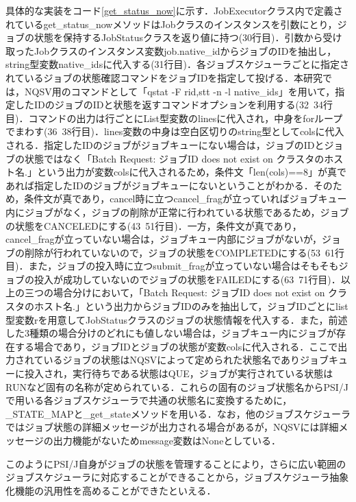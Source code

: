 具体的な実装をコード\ref{get_status_now}に示す．JobExecutorクラス内で定義されているget\_status\_nowメソッドはJobクラスのインスタンスを引数にとり，ジョブの状態を保持するJobStatusクラスを返り値に持つ(30行目)．引数から受け取ったJobクラスのインスタンス変数job.native\_idからジョブのIDを抽出し，string型変数native\_idsに代入する(31行目)．各ジョブスケジューラごとに指定されているジョブの状態確認コマンドをジョブIDを指定して投げる．本研究では，NQSV用のコマンドとして「qstat -F rid,stt -n -l native\_ids」を用いて，指定したIDのジョブのIDと状態を返すコマンドオプションを利用する(32~34行目)．コマンドの出力は行ごとにList型変数のlinesに代入され，中身をforループでまわす(36~38行目)．lines変数の中身は空白区切りのstring型としてcolsに代入される．指定したIDのジョブがジョブキューにない場合は，ジョブのIDとジョブの状態ではなく「Batch Request: ジョブID does not exist on クラスタのホスト名.」という出力が変数colsに代入されるため，条件文「len(cols)==8」が真であれば指定したIDのジョブがジョブキューにないということがわかる．そのため，条件文が真であり，cancel時に立つcancel\_fragが立っていればジョブキュー内にジョブがなく，ジョブの削除が正常に行われている状態であるため，ジョブの状態をCANCELEDにする(43~51行目)．一方，条件文が真であり，cancel\_fragが立っていない場合は，ジョブキュー内部にジョブがないが，ジョブの削除が行われていないので，ジョブの状態をCOMPLETEDにする(53~61行目)．また，ジョブの投入時に立つsubmit\_fragが立っていない場合はそもそもジョブの投入が成功していないのでジョブの状態をFAILEDにする(63~71行目)．以上の三つの場合分けにおいて，「Batch Request: ジョブID does not exist on クラスタのホスト名.」という出力からジョブIDのみを抽出して，ジョブIDごとにlist型変数rを用意してJobStatusクラスのジョブの状態情報を代入する．また，前述した3種類の場合分けのどれにも値しない場合は，ジョブキュー内にジョブが存在する場合であり，ジョブIDとジョブの状態が変数colsに代入される．ここで出力されているジョブの状態はNQSVによって定められた状態名でありジョブキューに投入され，実行待ちである状態はQUE，ジョブが実行されている状態はRUNなど固有の名称が定められている．これらの固有のジョブ状態名からPSI/Jで用いる各ジョブスケジューラで共通の状態名に変換するために，\_STATE\_MAPと\_get\_stateメソッドを用いる．なお，他のジョブスケジューラではジョブ状態の詳細メッセージが出力される場合があるが，NQSVには詳細メッセージの出力機能がないためmessage変数はNoneとしている．\par
このようにPSI/J自身がジョブの状態を管理することにより，さらに広い範囲のジョブスケジューラに対応することができることから，ジョブスケジューラ抽象化機能の汎用性を高めることができたといえる．\par


